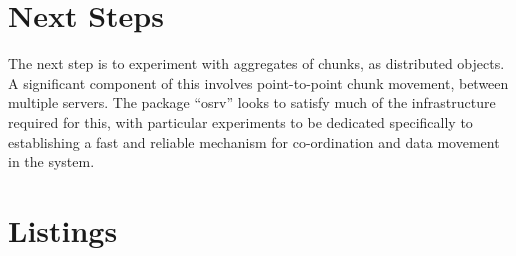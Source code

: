 \documentclass[a4paper,10pt]{article}
\begin{document}
\section{Next Steps}

The next step is to experiment with aggregates of chunks, as distributed objects.
A significant component of this involves point-to-point chunk movement, between multiple servers.
The package ``osrv'' looks to satisfy much of the infrastructure required for
this, with particular experiments to be dedicated specifically to establishing
a fast and reliable mechanism for co-ordination and data movement in the system.

\section{Listings}\label{sec:listings}









\end{document}
